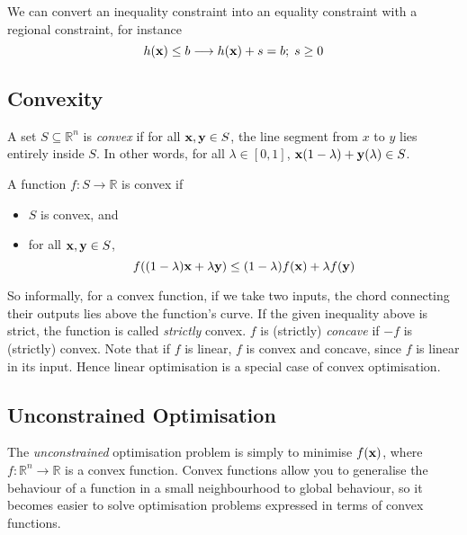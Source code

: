 We can convert an inequality constraint into an equality constraint with a regional constraint, for instance
\[
	h(\vb x) \leq b \longrightarrow h(\vb x) + s = b;\; s \geq 0
\]

\subsection{Convexity}
\begin{definition}
	A set \(S \subseteq \mathbb R^n\) is \textit{convex} if for all \(\vb x, \vb y \in S\), the line segment from \(x\) to \(y\) lies entirely inside \(S\).
	In other words, for all \(\lambda \in [0, 1]\), \(\vb x(1-\lambda) + \vb y(\lambda) \in S\).
\end{definition}

\begin{definition}
	A function \(f \colon S \to \mathbb R\) is convex if
	\begin{itemize}
		\item \(S\) is convex, and
		\item for all \(\vb x, \vb y \in S\),
		      \[
			      f\qty((1-\lambda)\vb x + \lambda \vb y) \leq (1-\lambda)f(\vb x) + \lambda f(\vb y)
		      \]
	\end{itemize}
\end{definition}
\noindent So informally, for a convex function, if we take two inputs, the chord connecting their outputs lies above the function's curve.
If the given inequality above is strict, the function is called \textit{strictly} convex.
\(f\) is (strictly) \textit{concave} if \(-f\) is (strictly) convex.
Note that if \(f\) is linear, \(f\) is convex and concave, since \(f\) is linear in its input.
Hence linear optimisation is a special case of convex optimisation.

\subsection{Unconstrained Optimisation}
The \textit{unconstrained} optimisation problem is simply to minimise \(f(\vb x)\), where \(f \colon \mathbb R^n \to \mathbb R\) is a convex function.
Convex functions allow you to generalise the behaviour of a function in a small neighbourhood to global behaviour, so it becomes easier to solve optimisation problems expressed in terms of convex functions.

